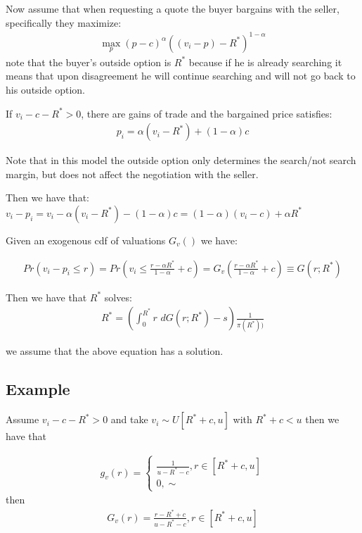 \documentclass[12pt]{article}
\theoremstyle{plain}
\theoremstyle{plain}
\begin{document}
Now assume that when requesting a quote the buyer bargains with the seller, specifically they maximize: 
\begin{align*}
    \max_p (p-c)^\alpha ((v_i-p) - R^*)^{1-\alpha}
\end{align*}
note that the buyer's outside option is $R^*$ because if he is already searching it means that upon disagreement he will continue searching and will not go back to his outside option. 

If $v_i - c- R^*> 0$, there are gains of trade and the bargained price satisfies: 
\begin{align}\label{eq:bargained_prices}
    p_i=\alpha (v_i - R^*)+ (1-\alpha)c 
\end{align}


Note that in this model the outside option only determines the search/not search margin, but does not affect the negotiation with the seller. 

Then we have that: 
$v_i - p_i = v_i - \alpha (v_i - R^*)- (1-\alpha)c  = (1-\alpha)(v_i -c) +\alpha R^*$

Given an exogenous cdf of valuations $G_v()$ we have: 

\begin{align*}
    Pr(v_i-p_i\leq r) = Pr\left(v_i \leq \frac{r-\alpha R^*}{1-\alpha}+c\right)= G_v\left( \frac{r-\alpha R^*}{1-\alpha}+c\right) \equiv G(r; R^*)
\end{align*}


Then we have that $R^*$ solves: 
\begin{align}\label{eq:reservation_utility2}
        R^* = \left( \int_0^{R^*} r \, \, dG(r; R^*) -s\right)\frac{1}{\pi(R^*))} 
\end{align}

we assume that the above equation has a solution.


\subsection{Example}

Assume $v_i - c - R^*>0$ and take $v_i \sim U[R^*+c, u]$ with $R^*+c< u$ then we have that 

\begin{align}
    g_v(r) = 
    \begin{cases}
        \frac{1}{u-R^*-c}, r\in [R^*+c, u]\\ 
        0, \sim 
    \end{cases}
\end{align}
then
\begin{align}
    G_v(r) =  
        \frac{r-R^*+c}{u-R^*-c}, r\in [R^*+c, u]
\end{align}
\end{document}
